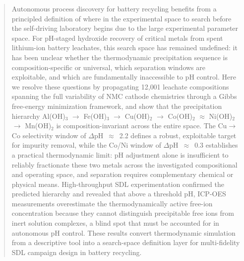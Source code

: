 \documentclass[final,2p,times]{elsarticle}
\begin{document}
\begin{frontmatter}
\begin{abstract}
Autonomous process discovery for battery recycling benefits from a principled definition of where in the experimental space to search before the self-driving laboratory begins due to the large experimental parameter space. For pH-staged hydroxide recovery of critical metals from spent lithium-ion battery leachates, this search space has remained undefined: it has been unclear whether the thermodynamic precipitation sequence is composition-specific or universal, which separation windows are exploitable, and which are fundamentally inaccessible to pH control. Here we resolve these questions by propagating 12{,}001 leachate compositions spanning the full variability of NMC cathode chemistries through a Gibbs free-energy minimization framework, and show that the precipitation hierarchy Al(OH)$_3$ $\to$ Fe(OH)$_3$ $\to$ Cu(OH)$_2$ $\to$ Co(OH)$_2$ $\approx$ Ni(OH)$_2$ $\to$ Mn(OH)$_2$ is composition-invariant across the entire space. The Cu$\to$Co selectivity window of $\Delta$pH~$\approx$~2.2 defines a robust, exploitable target for impurity removal, while the Co/Ni window of $\Delta$pH~$\approx$~0.3 establishes a practical thermodynamic limit: pH adjustment alone is insufficient to reliably fractionate these two metals across the investigated compositional and operating space, and separation requires complementary chemical or physical means. High-throughput SDL experimentation confirmed the predicted hierarchy and revealed that above a threshold pH, ICP-OES measurements overestimate the thermodynamically active free-ion concentration because they cannot distinguish precipitable free ions from inert solution complexes, a blind spot that must be accounted for in autonomous pH control. These results convert thermodynamic simulation from a descriptive tool into a search-space definition layer for multi-fidelity SDL campaign design in battery recycling.
\end{abstract}


\begin{graphicalabstract}
\end{graphicalabstract}


\end{frontmatter}
\end{document}
